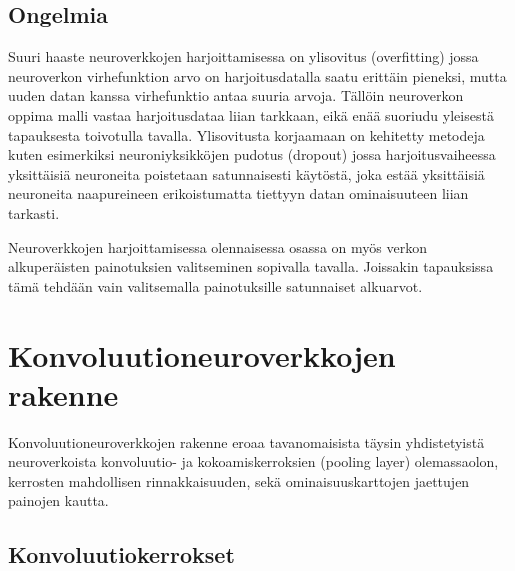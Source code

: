 \documentclass[finnish]{tktltiki2}
\theoremstyle{definition}
\theoremstyle{remark}
\begin{document}



  \subsection{Ongelmia}

  Suuri haaste neuroverkkojen harjoittamisessa on ylisovitus (overfitting) jossa neuroverkon virhefunktion arvo on harjoitusdatalla saatu erittäin pieneksi, mutta uuden datan kanssa virhefunktio antaa suuria arvoja. Tällöin neuroverkon oppima malli vastaa harjoitusdataa liian tarkkaan, eikä enää suoriudu yleisestä tapauksesta toivotulla tavalla. Ylisovitusta korjaamaan on kehitetty metodeja kuten esimerkiksi neuroniyksikköjen pudotus (dropout) jossa harjoitusvaiheessa yksittäisiä neuroneita poistetaan satunnaisesti käytöstä, joka estää yksittäisiä neuroneita naapureineen erikoistumatta tiettyyn datan ominaisuuteen liian tarkasti.

  Neuroverkkojen harjoittamisessa olennaisessa osassa on myös verkon alkuperäisten painotuksien valitseminen sopivalla tavalla. Joissakin tapauksissa tämä tehdään vain valitsemalla painotuksille satunnaiset alkuarvot.

  \section{Konvoluutioneuroverkkojen rakenne}
  Konvoluutioneuroverkkojen rakenne eroaa tavanomaisista täysin yhdistetyistä neuroverkoista konvoluutio- ja kokoamiskerroksien (pooling layer) olemassaolon, kerrosten mahdollisen rinnakkaisuuden, sekä ominaisuuskarttojen jaettujen painojen kautta.   
  

  \subsection{Konvoluutiokerrokset}
\end{document}
